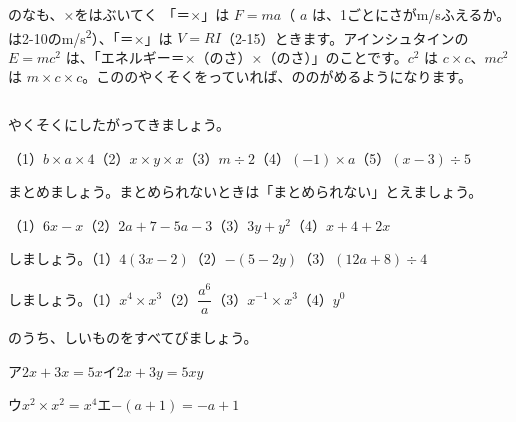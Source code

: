 \begin{column}{のなも、×をはぶいてく}
「＝×」は $F=ma$（ $a$ は、1ごとにさがm/sふえるか。は2-10の\unit{m/s^2}）、「＝×」は $V=RI$（2-15）ときます。アインシュタインの $E=mc^2$ は、「エネルギー＝×（のさ）×（のさ）」のことです。$c^2$ は $c\times c$、$mc^2$ は $m\times c\times c$。こののやくそくをっていれば、ののがめるようになります。
\end{column}

\clearpage
\bkendproblems
{}

\bkproblem やくそくにしたがってきましょう。\par
（1）\nobreak $b\times a\times4$\quad（2）\nobreak $x\times y\times x$\quad（3）\nobreak $m\div2$\quad（4）\nobreak $(-1)\times a$\quad（5）\nobreak $(x-3)\div5$

\bkproblem まとめましょう。まとめられないときは「まとめられない」とえましょう。\par
（1）\nobreak $6x-x$\quad（2）\nobreak $2a+7-5a-3$\quad（3）\nobreak $3y+y^2$\quad（4）\nobreak $x+4+2x$

\bkproblem {}しましょう。\quad（1）\nobreak $4(3x-2)$\quad（2）\nobreak $-(5-2y)$\quad（3）\nobreak $(12a+8)\div4$

\bkproblem {}しましょう。\quad（1）\nobreak $x^4\times x^3$\quad（2）\nobreak $\dfrac{a^6}{a}$\quad（3）\nobreak $x^{-1}\times x^3$\quad（4）\nobreak $y^0$

\bkproblem {}のうち、しいものをすべてびましょう。\par
\noindent\hspace*{1\zw}ア\enspace $2x+3x=5x$\hspace{4\zw}イ\enspace $2x+3y=5xy$\par
\noindent\hspace*{1\zw}ウ\enspace $x^2\times x^2=x^4$\hspace{3.4\zw}エ\enspace $-(a+1)=-a+1$

